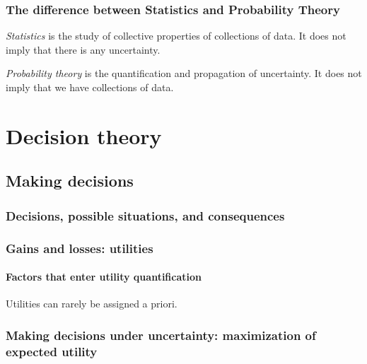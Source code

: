 \documentclass[
  a4paper,
  DIV=11,
  numbers=noendperiod,
  oneside]{scrreprt}
\begin{document}
\providecommand*{\mo}[1][=]{\mathord{\,#1\,}}
\providecommand*{\yX}{\se{X}}
\providecommand*{\yY}{\se{Y}}
\providecommand*{\yI}{\se{I}}
\providecommand{\di}{\mathrm{d}}

\hypertarget{the-difference-between-statistics-and-probability-theory}{%
\section{The difference between Statistics and Probability
Theory}\label{the-difference-between-statistics-and-probability-theory}}

\emph{Statistics} is the study of collective properties of collections
of data. It does not imply that there is any uncertainty.

\emph{Probability theory} is the quantification and propagation of
uncertainty. It does not imply that we have collections of data.

\part{Decision theory}

\hypertarget{making-decisions}{%
\chapter{Making decisions}\label{making-decisions}}

\hypertarget{decisions-possible-situations-and-consequences}{%
\section{Decisions, possible situations, and
consequences}\label{decisions-possible-situations-and-consequences}}

\hypertarget{gains-and-losses-utilities}{%
\section{Gains and losses: utilities}\label{gains-and-losses-utilities}}

\hypertarget{factors-that-enter-utility-quantification}{%
\subsection{Factors that enter utility
quantification}\label{factors-that-enter-utility-quantification}}

Utilities can rarely be assigned a priori.

\hypertarget{making-decisions-under-uncertainty-maximization-of-expected-utility}{%
\section{Making decisions under uncertainty: maximization of expected
utility}\label{making-decisions-under-uncertainty-maximization-of-expected-utility}}
\end{document}
